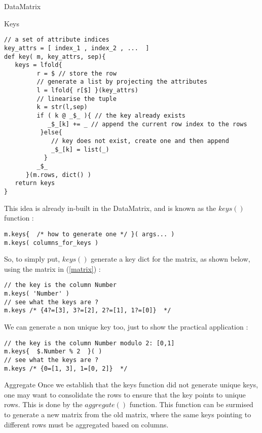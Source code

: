 \begin{section}{DataMatrix}
\begin{subsection}{Keys}
\begin{center}\begin{minipage}{\linewidth}
\begin{lstlisting}[style=JexlStyle]
// a set of attribute indices 
key_attrs = [ index_1 , index_2 , ...  ]
def key( m, key_attrs, sep){
   keys = lfold{  
         r = $ // store the row
         // generate a list by projecting the attributes 
         l = lfold{ r[$] }(key_attrs)
         // linearise the tuple 
         k = str(l,sep)
         if ( k @ _$_ ){ // the key already exists 
            _$_[k] += _ // append the current row index to the rows
          }else{
             // key does not exist, create one and then append 
             _$_[k] = list(_) 
           }
         _$_    
      }(m.rows, dict() )
   return keys
}
\end{lstlisting}
\end{minipage}\end{center}


This idea is already in-built in the DataMatrix, and is known as the $keys()$ function :

\begin{lstlisting}[style=JexlStyle]
m.keys{  /* how to generate one */ }( args... )
m.keys( columns_for_keys )
\end{lstlisting}

So, to simply put, $keys()$ generate a key dict for the matrix, as shown below, 
using the  matrix in (\ref{matrix}) :  

\begin{lstlisting}[style=JexlStyle]
// the key is the column Number
m.keys( 'Number' )
// see what the keys are ?
m.keys /* {4?=[3], 3?=[2], 2?=[1], 1?=[0]}  */
\end{lstlisting}

We can generate a non unique key too, just to show the practical application :

\begin{lstlisting}[style=JexlStyle]
// the key is the column Number modulo 2: [0,1]
m.keys{  $.Number % 2  }( )
// see what the keys are ?
m.keys /* {0=[1, 3], 1=[0, 2]}  */
\end{lstlisting}

\end{subsection}

\begin{subsection}{Aggregate}
Once we establish that the keys function did not generate unique keys, one may want to 
consolidate the rows to ensure that the key points to unique rows.
This is done by the $aggregate()$ function. This function can be surmised to
generate a new matrix from the old matrix, where the same keys pointing to different rows
must be aggregated based on columns.


\end{subsection}
\end{section}
